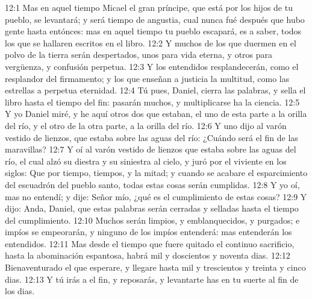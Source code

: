 12:1 Mas en aquel tiempo Micael el gran príncipe, que está por los hijos de tu pueblo, se levantará; y será tiempo de angustia, cual nunca fué después que hubo gente hasta entónces: mas en aquel tiempo tu pueblo escapará, es a saber, todos los que se hallaren escritos en el libro.
12:2 Y muchos de los que duermen en el polvo de la tierra serán despertados, unos para vida eterna, y otros para vergüenza, y confusión perpetua.
12:3 Y los entendidos resplandecerán, como el resplandor del firmamento; y los que enseñan a justicia la multitud, como las estrellas a perpetua eternidad.
12:4 Tú pues, Daniel, cierra las palabras, y sella el libro hasta el tiempo del fin: pasarán muchos, y multiplicarse ha la ciencia.
12:5 Y yo Daniel miré, y he aquí otros dos que estaban, el uno de esta parte a la orilla del río, y el otro de la otra parte, a la orilla del río.
12:6 Y uno dijo al varón vestido de lienzos, que estaba sobre las aguas del río: ¿Cuándo será el fin de las maravillas?
12:7 Y oí al varón vestido de lienzos que estaba sobre las aguas del río, el cual alzó su diestra y su siniestra al cielo, y juró por el viviente en los siglos: Que por tiempo, tiempos, y la mitad; y cuando se acabare el esparcimiento del escuadrón del pueblo santo, todas estas cosas serán cumplidas.
12:8 Y yo oí, mas no entendí; y dije: Señor mío, ¿qué es el cumplimiento de estas cosas?
12:9 Y dijo: Anda, Daniel, que estas palabras serán cerradas y selladas hasta el tiempo del cumplimiento.
12:10 Muchos serán limpios, y emblanquecidos, y purgados; e impíos se empeorarán, y ninguno de los impíos entenderá: mas entenderán los entendidos.
12:11 Mas desde el tiempo que fuere quitado el continuo sacrificio, hasta la abominación espantosa, habrá mil y doscientos y noventa dias.
12:12 Bienaventurado el que esperare, y llegare hasta mil y trescientos y treinta y cinco dias.
12:13 Y tú irás a el fin, y reposarás, y levantarte has en tu suerte al fin de los dias.

